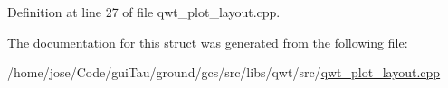 Definition at line 27 of file qwt\-\_\-plot\-\_\-layout.\-cpp.



The documentation for this struct was generated from the following file\-:\begin{DoxyCompactItemize}
\item 
/home/jose/\-Code/gui\-Tau/ground/gcs/src/libs/qwt/src/\hyperlink{qwt__plot__layout_8cpp}{qwt\-\_\-plot\-\_\-layout.\-cpp}\end{DoxyCompactItemize}

